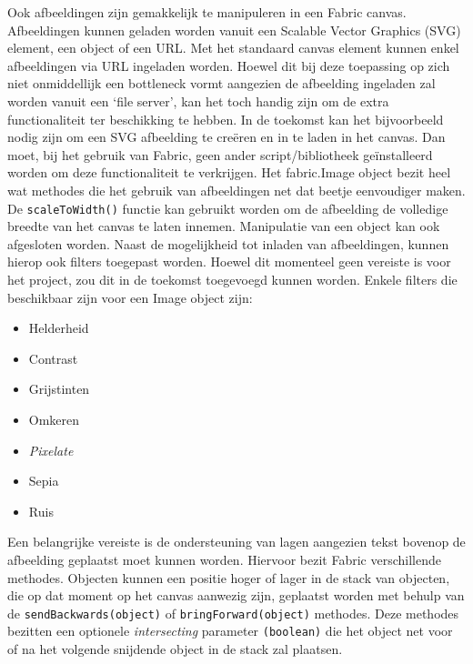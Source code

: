 Ook afbeeldingen zijn gemakkelijk te manipuleren in een Fabric canvas. Afbeeldingen kunnen geladen worden vanuit een Scalable Vector Graphics (SVG) element, een object of een URL. Met het standaard canvas element kunnen enkel afbeeldingen via URL ingeladen worden. Hoewel dit bij deze toepassing op zich niet onmiddellijk een bottleneck vormt aangezien de afbeelding ingeladen zal worden vanuit een `file server', kan het toch handig zijn om de extra functionaliteit ter beschikking te hebben. In de toekomst kan het bijvoorbeeld nodig zijn om een SVG afbeelding te cre\"{e}ren en in te laden in het canvas. Dan moet, bij het gebruik van Fabric, geen ander script/bibliotheek ge\"{i}nstalleerd worden om deze functionaliteit te verkrijgen. Het fabric.Image object bezit heel wat methodes die het gebruik van afbeeldingen net dat beetje eenvoudiger maken. De \lstinline{scaleToWidth()} functie kan gebruikt worden om de afbeelding de volledige breedte van het canvas te laten innemen. Manipulatie van een object kan ook afgesloten worden. 
Naast de mogelijkheid tot inladen van afbeeldingen, kunnen hierop ook filters toegepast worden. Hoewel dit momenteel geen vereiste is voor het project, zou dit in de toekomst toegevoegd kunnen worden. Enkele filters die beschikbaar zijn voor een Image object zijn:  

\begin{itemize}
	\item Helderheid
	\item Contrast
	\item Grijstinten
	\item Omkeren
	\item \textit{Pixelate}
	\item Sepia
	\item Ruis
\end{itemize}

Een belangrijke vereiste is de ondersteuning van lagen aangezien tekst bovenop de afbeelding geplaatst moet kunnen worden. Hiervoor bezit Fabric verschillende methodes. Objecten kunnen een positie hoger of lager in de stack van objecten, die op dat moment op het canvas aanwezig zijn, geplaatst worden met behulp van de \lstinline|sendBackwards(object)| of \lstinline|bringForward(object)| methodes. Deze methodes bezitten een optionele \textit{intersecting} parameter \lstinline{(boolean)} die het object net voor of na het volgende snijdende object in de stack zal plaatsen. 

